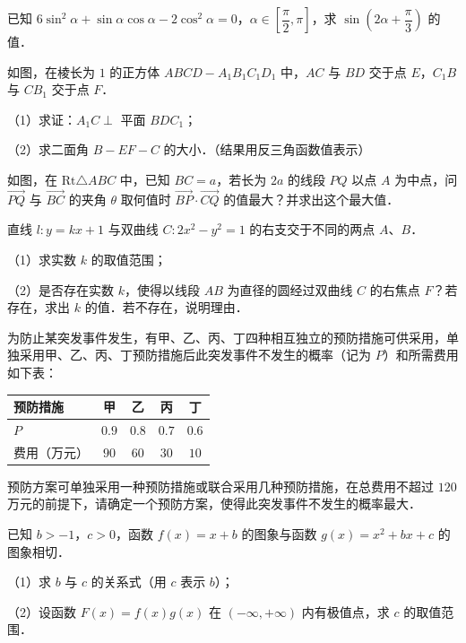 \begin{question}
已知 $6\sin^2\alpha + \sin\alpha\cos\alpha - 2\cos^2\alpha = 0$，$\alpha \in \left[\dfrac{\pi}{2}, \pi\right]$，求 $\sin\left(2\alpha + \dfrac{\pi}{3}\right)$ 的值．

\Needspace{0.4\textheight}
\end{question}
\begin{question}
如图，在棱长为 $1$ 的正方体 $ABCD - A_1B_1C_1D_1$ 中，$AC$ 与 $BD$ 交于点 $E$，$C_1B$ 与 $CB_1$ 交于点 $F$．

（1）求证：$A_1C \perp$ 平面 $BDC_1$；

（2）求二面角 $B - EF - C$ 的大小．（结果用反三角函数值表示）
\nopagebreak[4]
\begin{center}\end{center}
\nopagebreak[4]
\Needspace{0.4\textheight}
\end{question}
\begin{question}
如图，在 $\mathrm{Rt}\triangle ABC$ 中，已知 $BC = a$，若长为 $2a$ 的线段 $PQ$ 以点 $A$ 为中点，问 $\vec{PQ}$ 与 $\vec{BC}$ 的夹角 $\theta$ 取何值时 $\vec{BP} \cdot \vec{CQ}$ 的值最大？并求出这个最大值．
\nopagebreak[4]
\begin{center}\end{center}
\nopagebreak[4]
\end{question}
\begin{question}
直线 $l: y = kx + 1$ 与双曲线 $C: 2x^2 - y^2 = 1$ 的右支交于不同的两点 $A$、$B$．

（1）求实数 $k$ 的取值范围；

（2）是否存在实数 $k$，使得以线段 $AB$ 为直径的圆经过双曲线 $C$ 的右焦点 $F$？若存在，求出 $k$ 的值．若不存在，说明理由．

\end{question}
\begin{question}
为防止某突发事件发生，有甲、乙、丙、丁四种相互独立的预防措施可供采用，单独采用甲、乙、丙、丁预防措施后此突发事件不发生的概率（记为 $P$）和所需费用如下表：

\begin{center}
\begin{tabular}{lcccc}
\toprule
预防措施 & 甲 & 乙 & 丙 & 丁 \\
\midrule
$P$ & $0.9$ & $0.8$ & $0.7$ & $0.6$ \\
费用（万元） & $90$ & $60$ & $30$ & $10$ \\
\bottomrule
\end{tabular}
\end{center}

预防方案可单独采用一种预防措施或联合采用几种预防措施，在总费用不超过 $120$ 万元的前提下，请确定一个预防方案，使得此突发事件不发生的概率最大．

\end{question}
\begin{question}
已知 $b > -1$，$c > 0$，函数 $f(x) = x + b$ 的图象与函数 $g(x) = x^2 + bx + c$ 的图象相切．

（1）求 $b$ 与 $c$ 的关系式（用 $c$ 表示 $b$）；

（2）设函数 $F(x) = f(x)g(x)$ 在 $(-\infty, +\infty)$ 内有极值点，求 $c$ 的取值范围．

\end{question}